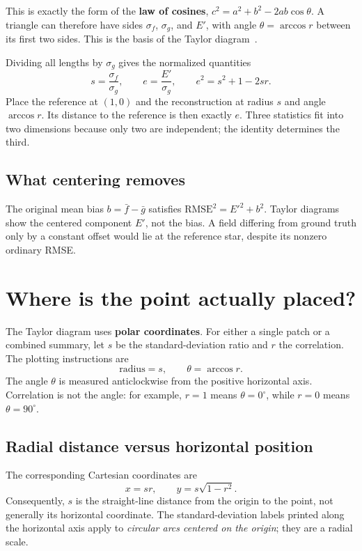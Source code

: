 \documentclass[11pt,a4paper]{article}
\begin{document}
This is exactly the form of the \textbf{law of cosines}, $c^2=a^2+b^2-2ab\cos\theta$. A triangle can therefore have sides $\sigma_f$, $\sigma_g$, and $E'$, with angle $\theta=\arccos r$ between its first two sides. This is the basis of the Taylor diagram~\cite{taylor}.

Dividing all lengths by $\sigma_g$ gives the normalized quantities
\[
s=\frac{\sigma_f}{\sigma_g},\qquad e=\frac{E'}{\sigma_g},
\qquad\boxed{e^2=s^2+1-2sr.}
\]
Place the reference at $(1,0)$ and the reconstruction at radius $s$ and angle $\arccos r$. Its distance to the reference is then exactly $e$. Three statistics fit into two dimensions because only two are independent; the identity determines the third.

\subsection*{What centering removes}
The original mean bias $b=\bar f-\bar g$ satisfies $\mathrm{RMSE}^2=E'^2+b^2$. Taylor diagrams show the centered component $E'$, not the bias. A field differing from ground truth only by a constant offset would lie at the reference star, despite its nonzero ordinary RMSE.

\newpage
\section*{Where is the point actually placed?}

The Taylor diagram uses \textbf{polar coordinates}. For either a single patch or a combined summary, let $s$ be the standard-deviation ratio and $r$ the correlation. The plotting instructions are
\[
\boxed{\text{radius}=s,\qquad \theta=\arccos r.}
\]
The angle $\theta$ is measured anticlockwise from the positive horizontal axis. Correlation is not the angle: for example, $r=1$ means $\theta=0^\circ$, while $r=0$ means $\theta=90^\circ$.

\subsection*{Radial distance versus horizontal position}
The corresponding Cartesian coordinates are
\[
\boxed{x=sr,\qquad y=s\sqrt{1-r^2}.}
\]
Consequently, $s$ is the straight-line distance from the origin to the point, not generally its horizontal coordinate. The standard-deviation labels printed along the horizontal axis apply to \emph{circular arcs centered on the origin}; they are a radial scale.
\end{document}
